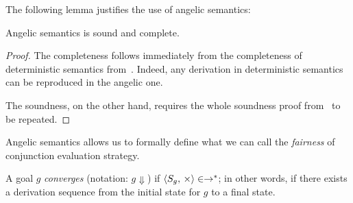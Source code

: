The following lemma justifies the use of angelic semantics:

\begin{lemma}
  Angelic semantics is sound and complete.
\end{lemma}
\begin{proof}
  The completeness follows immediately from the completeness of deterministic semantics from~\cite{fair:semantics}. Indeed, any derivation in deterministic semantics can be reproduced in
  the angelic one.

  The soundness, on the other hand, requires the whole soundness proof from~\cite{fair:semantics} to be repeated. 
\end{proof}

Angelic semantics allows us to formally define what we can call the \emph{fairness} of conjunction evaluation strategy.

\begin{definition}[Convergence]
  A goal $g$ \emph{converges} (notation: $g\Downarrow$) if $\langle S_g,\,\times \rangle\in\rightarrow^*$; in other words, if there exists a derivation sequence from the initial state for $g$ to a
  final state.
\end{definition}


\begin{comment}
При этом нами было доказано, что данная семантика эквивалентна денатоционнй семантике \mk~\cite{fair:semantics}, поэтому любой порядок развёрток приводит к одинаковому набору ответов с точностью до порядка этих ответов.
\textcolor{red}{Понятно, что надо подробнее о доказательстве. Но чтобы хотя бы сформулировать теоремы о полноте и корректности надо описать, что такое represent function, след семантики, денотационный образ состояния и т.д.. Хочу обсудить, насколько подробно нужно.}

В отличие от классических left-biased реализаций \mk данная недетерминированная семантика сходится вне зависимости от порядка конъюнктов. Однако она недетерминирована, что сводит к нулю практическую ценность данной семантики. Поэтому в следующих главах мы обсудим две детерминированные семантики, которые сходятся тогда и только тогда, когда сходится недетерминированная.
\end{comment}
